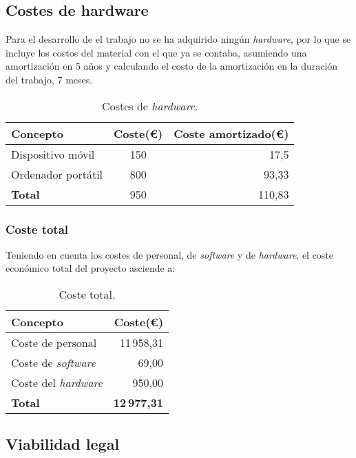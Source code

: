 \subsection{Costes de hardware}
Para el desarrollo de el trabajo no se ha adquirido ningún \emph{hardware}, por lo que se incluye los costos del material con el que ya se contaba, asumiendo una amortización en 5 años y calculando el costo de la amortización en la duración del trabajo, 7 meses.
\begin{table}[H]
		\centering
		\begin{tabular}[]{@{}l c r@{}}
			\toprule
			\textbf{Concepto} & \textbf{Coste(\euro{})} & \textbf{Coste amortizado(\euro{})} \\
			\midrule
			Dispositivo móvil & 150 & 17,5 \\
			Ordenador portátil  & 800 & 93,33 \\
			\midrule
			\textbf{Total} & 950 & 110,83 \\
			\bottomrule
		\end{tabular}
		\caption{Costes de \textit{hardware}.}
		\label{tab:costes_hardware}
	\end{table}

\subsubsection{Coste total}
	
	Teniendo en cuenta los costes de personal, de \emph{software} y de \textit{hardware}, el coste económico total del proyecto asciende a:
	

	\begin{table}[H]
		\centering
		\begin{tabular}[]{@{}l r@{}}
			\toprule
			\textbf{Concepto} & \textbf{Coste(\euro{})} \\
			\midrule
			Coste de personal & 11\,958,31 \\ 
            Coste de \textit{software} & 69,00\\
			Coste del \textit{hardware} & 950,00 \\
			\midrule
			\textbf{Total} & \textbf{12\,977,31} \\	
			\bottomrule	
		\end{tabular}
		\caption{Coste total.}
		\label{tab:coste_total}
	\end{table}
	
\subsection{Viabilidad legal}

